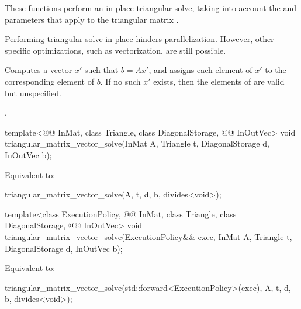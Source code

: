 \begin{itemdescr}
\pnum
These functions perform an in-place triangular solve,
taking into account the  and  parameters
that apply to the triangular matrix .
\begin{note}
Performing triangular solve in place hinders parallelization.
However, other  specific optimizations,
such as vectorization, are still possible.
\end{note}

\pnum
\effects
Computes a vector $x'$ such that $b = A x'$,
and assigns each element of $x'$ to the corresponding element of $b$.
If no such $x'$ exists,
then the elements of  are valid but unspecified.

\pnum
\complexity
{}.
\end{itemdescr}

\begin{itemdecl}
template<@@ InMat, class Triangle, class DiagonalStorage, @@ InOutVec>
  void triangular_matrix_vector_solve(InMat A, Triangle t, DiagonalStorage d, InOutVec b);
\end{itemdecl}

\begin{itemdescr}
\pnum
\effects
Equivalent to:
\begin{codeblock}
triangular_matrix_vector_solve(A, t, d, b, divides<void>{});
\end{codeblock}
\end{itemdescr}

\begin{itemdecl}
template<class ExecutionPolicy,
         @@ InMat, class Triangle, class DiagonalStorage, @@ InOutVec>
  void triangular_matrix_vector_solve(ExecutionPolicy&& exec,
                                      InMat A, Triangle t, DiagonalStorage d, InOutVec b);
\end{itemdecl}

\begin{itemdescr}
\pnum
\effects
Equivalent to:
\begin{codeblock}
triangular_matrix_vector_solve(std::forward<ExecutionPolicy>(exec),
                               A, t, d, b, divides<void>{});
\end{codeblock}
\end{itemdescr}

